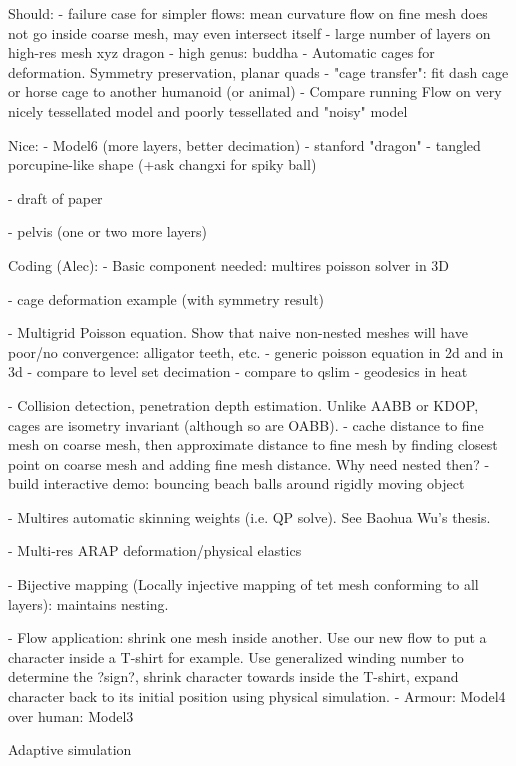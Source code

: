 Should:
  - failure case for simpler flows: mean curvature flow on fine mesh does not
    go inside coarse mesh, may even intersect itself
  - large number of layers on high-res mesh xyz dragon
  - high genus: buddha
  - Automatic cages for deformation. Symmetry preservation, planar quads
    - "cage transfer": fit dash cage or horse cage to another humanoid (or
      animal)
  - Compare running Flow on very nicely tessellated model and poorly
  tessellated and "noisy" model

Nice:
  - Model6 (more layers, better decimation)
  - stanford "dragon"
  - tangled porcupine-like shape (+ask changxi for spiky ball)

- draft of paper

- pelvis (one or two more layers)



Coding (Alec):
 - Basic component needed: multires poisson solver in 3D

 - cage deformation example (with symmetry result)

 - Multigrid Poisson equation. Show that naive non-nested meshes will have
   poor/no convergence: alligator teeth, etc.
     - generic poisson equation in 2d and in 3d
       - compare to level set decimation
       - compare to qslim
     - geodesics in heat 

 - Collision detection, penetration depth estimation. Unlike AABB or KDOP, cages
   are isometry invariant (although so are OABB).
     - cache distance to fine mesh on coarse mesh, then approximate distance to
       fine mesh by finding closest point on coarse mesh and adding fine mesh
       distance. Why need nested then?
     - build interactive demo: bouncing beach balls around rigidly moving object
   
 - Multires automatic skinning weights (i.e. QP solve). See Baohua Wu's thesis.
   
 - Multi-res ARAP deformation/physical elastics

 - Bijective mapping (Locally injective mapping of tet mesh conforming to all
   layers): maintains nesting.

 - Flow application: shrink one mesh inside another. Use our new flow to put a 
  character inside a T-shirt for example. Use generalized winding number to 
  determine the ?sign?, shrink character towards inside the T-shirt, 
  expand character back to its initial position using physical simulation. 
    - Armour: Model4 over human: Model3

Adaptive simulation \cite{Debunne:2001:DRD}

